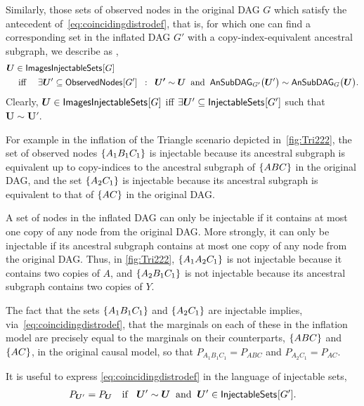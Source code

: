 Similarly,  those sets of observed nodes in the original DAG $G$ which satisfy the antecedent of~\cref{eq:coincidingdistrodef}, that is, for which one can find a corresponding set in the inflated DAG $G'$ with a copy-index-equivalent ancestral subgraph, we describe as ,
\begin{align}\begin{split}\label{eq:defimageinjectable}
& \bm{U}\in\SmallNamedFunction{ImagesInjectableSets}{G} \\
& \quad\text{ iff }\quad \exists \bm{U}' \subseteq \SmallNamedFunction{ObservedNodes}{G'} \;\; :\;\; \bm{U'}\sim\bm{U} \;\;\text{and}\;\; \ansubgraph[G']{\bm{U}'}\sim\ansubgraph[G]{\bm{U}}.
\end{split}\end{align}
Clearly, $\bm{U}\in\SmallNamedFunction{ImagesInjectableSets}{G}$ iff $\exists \bm{U}' \subseteq \SmallNamedFunction{InjectableSets}{G'}$ such that $\bm{U}\sim \bm{U}'$.


For example in the inflation of the Triangle scenario depicted in~\cref{fig:Tri222}, the set of observed nodes $\brackets{A_1 B_1 C_1}$ is injectable because its ancestral subgraph is equivalent up to copy-indices to the ancestral subgraph of $\brackets{A B C}$ in the original DAG, and the set $\brackets{A_2 C_1}$ is injectable because its ancestral subgraph is equivalent to that of $\brackets{ A C}$ in the original DAG. 

A set of nodes in the inflated DAG can only be injectable if it contains at most one copy of any node from the original DAG. More strongly, it can only be injectable if its ancestral subgraph contains at most one copy of any node from the original DAG.  
Thus, in \cref{fig:Tri222}, $\brackets{A_1 A_2 C_1}$ is not injectable because it contains two copies of $A$, and $\brackets{A_2 B_1 C_1}$ is not injectable because its ancestral subgraph contains two copies of $Y$. 

The fact that the sets $\brackets{A_1 B_1 C_1}$ and $\brackets{A_2 C_1}$ are injectable implies, via~\cref{eq:coincidingdistrodef}, that the marginals on each of these in the inflation model are precisely equal to the marginals on their counterparts, $\brackets{A B C}$ and $\brackets{A C}$, in the original causal model, so that $P_{A_1 B_1 C_1} = P_{A B C}$ and $P_{A_2 C_1} = P_{A C}$.

It is useful to express \cref{eq:coincidingdistrodef} in the language of injectable sets,
\begin{align}\label{keyinference}
P_{\bm{U}'}=P_{\bm{U}}\quad\text{if }  \;\; \bm{U}' \sim \bm{U}\;\; \text{and} \;\; \bm{U}'\in\SmallNamedFunction{InjectableSets}{G'}.%
\end{align}

